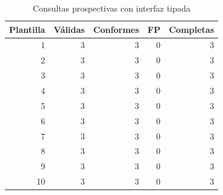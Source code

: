 \begin{table}[!t]
\caption{Consultas prospectivas con interfaz tipada}
\label{tab:queries}\centering\footnotesize
\begin{tabular}{rrrrr}\hline
Plantilla & Válidas & Conformes & FP & Completas\\\hline
1 & 3 & 3 & 0 & 3\\
2 & 3 & 3 & 0 & 3\\
3 & 3 & 3 & 0 & 3\\
4 & 3 & 3 & 0 & 3\\
5 & 3 & 3 & 0 & 3\\
6 & 3 & 3 & 0 & 3\\
7 & 3 & 3 & 0 & 3\\
8 & 3 & 3 & 0 & 3\\
9 & 3 & 3 & 0 & 3\\
10 & 3 & 3 & 0 & 3\\
\hline\end{tabular}\end{table}
